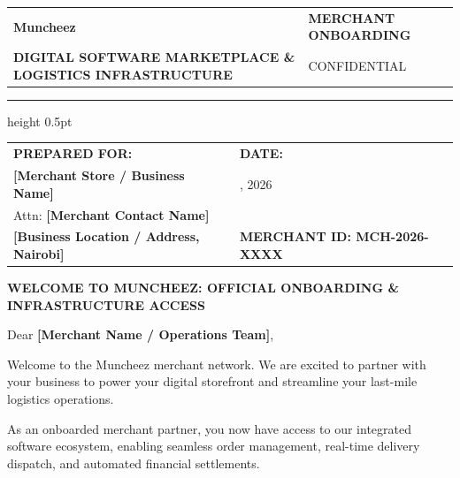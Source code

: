 \documentclass[11pt,a4paper]{article}
\begin{document}
\begin{tabularx}{\textwidth}{@{} X >{\raggedleft\arraybackslash}X @{}}
    {\fontsize{30}{36}\sffamily\bfseries\color{SolidBlack} Muncheez\color{LinkBlue}{\textbf{.}}} & \textsf{\small\bfseries\color{LinkBlue} MERCHANT ONBOARDING} \\
    {\textsf{\scriptsize\bfseries\color{SolidBlack} DIGITAL SOFTWARE MARKETPLACE \& LOGISTICS INFRASTRUCTURE}} & \textsf{\scriptsize\color{SolidBlack} CONFIDENTIAL} \\
\end{tabularx}

\vspace{0.2cm}
\hrule height 0.5pt
\vspace{0.5cm}

\begin{tabularx}{\textwidth}{@{} X >{\raggedleft\arraybackslash}X @{}}
    \textsf{\small\bfseries\color{SolidBlack} PREPARED FOR:} & \textsf{\small\bfseries\color{SolidBlack} DATE:} \\
    \textsf{\small\color{SolidBlack} \textbf{[Merchant Store / Business Name]}} & \textsf{\small\color{SolidBlack} \underline{\hspace{3.0cm}}, 2026} \\[0.05cm]
    \textsf{\small\color{SolidBlack} Attn: \textbf{[Merchant Contact Name]}} & \\
    \textsf{\small\color{SolidBlack} \textbf{[Business Location / Address, Nairobi]}} & \textsf{\small\bfseries\color{LinkBlue} MERCHANT ID: MCH-2026-XXXX} \\
\end{tabularx}

\vspace{0.5cm}

{\fontsize{13}{16}\sffamily\bfseries\color{SolidBlack} WELCOME TO MUNCHEEZ: OFFICIAL ONBOARDING \& INFRASTRUCTURE ACCESS}

\vspace{0.4cm}

Dear \textbf{[Merchant Name / Operations Team]},

Welcome to the Muncheez merchant network. We are excited to partner with your business to power your digital storefront and streamline your last-mile logistics operations.

As an onboarded merchant partner, you now have access to our integrated software ecosystem, enabling seamless order management, real-time delivery dispatch, and automated financial settlements.
\end{document}
